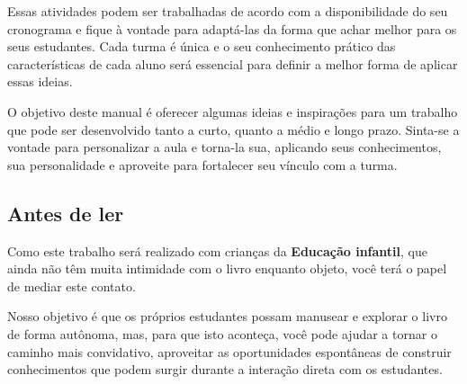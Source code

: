\documentclass[11pt]{extarticle}
\begin{document}
Essas atividades podem ser trabalhadas de acordo com a 
disponibilidade do seu cronograma e fique à vontade para adaptá-las 
da forma que achar melhor para os seus estudantes. Cada turma é única 
e o seu conhecimento prático das características de cada aluno será 
essencial para definir a melhor forma de aplicar essas ideias. 

O objetivo deste manual é oferecer algumas ideias 
e inspirações para um trabalho que pode ser desenvolvido tanto 
a curto, quanto a médio e longo prazo. Sinta-se a vontade para 
personalizar a aula e torna-la sua, aplicando seus conhecimentos, sua 
personalidade e aproveite para fortalecer 
seu vínculo com a turma.


\subsection{Antes de ler}


Como este trabalho será realizado com crianças da \textbf{Educação infantil}, 
que ainda não têm muita intimidade com o livro enquanto objeto, você terá o 
papel de mediar este contato. 

Nosso objetivo é que os próprios estudantes possam manusear e explorar o livro de forma autônoma, mas, para que isto aconteça, você pode ajudar a tornar o caminho mais convidativo, aproveitar as oportunidades espontâneas de construir conhecimentos que podem surgir durante a interação direta com os estudantes.


\end{document}
